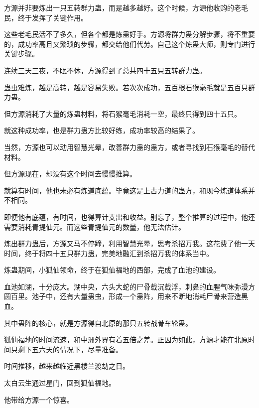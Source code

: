 \begin{this_body}
方源并非要炼出一只五转群力蛊，而是越多越好。这个时候，方源他收购的老毛民，终于发挥了关键作用。

这些老毛民活不了多久，但各个都是炼蛊好手。方源将群力蛊分解步骤，将不重要的，成功率高且又繁琐的步骤，都交给他们代劳。自己这个炼蛊大师，则专门进行关键步骤。

连续三天三夜，不眠不休，方源得到了总共四十五只五转群力蛊。

蛊虫难炼，越是高转，越是容易失败。若次次成功，五百根石猴毫毛就是五百只群力蛊。

但方源消耗了大量的炼蛊材料，将石猴毫毛消耗一空，最终只得到四十五只。

就这种成功率，也是群力蛊方比较好练，成功率较高的结果了。

当然，方源也可以动用智慧光晕，改善群力蛊的蛊方，或者寻找到石猴毫毛的替代材料。

但方源现在，却没有这个时间去慢慢推算。

就算有时间，他也未必有炼道底蕴。毕竟这是上古力道的蛊方，和现今炼道体系并不相同。

即便他有底蕴，有时间，也得算计支出和收益。别忘了，整个推算的过程中，他还需要消耗青提仙元。而这些青提仙元的数量，他无法估计。

炼出群力蛊后，方源又马不停蹄，利用智慧光晕，思考杀招万我。这花费了他一天时间，终于将四十五只群力蛊，完美地融汇到杀招万我的体系当中。

炼蛊期间，小狐仙领命，终于在狐仙福地的西部，完成了血池的建设。

血池如湖，十分庞大。湖中央，六头大蛇的尸骨载沉载浮，刺鼻的血腥气味弥漫方圆百里。池子中，还有大量蛊虫，形成一个蛊阵，用来不断地消耗尸骨来营造黑血。

其中蛊阵的核心，就是方源得自北原的那只五转战骨车轮蛊。

狐仙福地的时间流速，和中洲外界有着五倍之差。正因为如此，方源才能在北原时间只剩下五六天的情况下，尽量准备。

时间推移，越来越临近黑楼兰渡劫之日。

太白云生通过星门，回到狐仙福地。

他带给方源一个惊喜。

\end{this_body}

